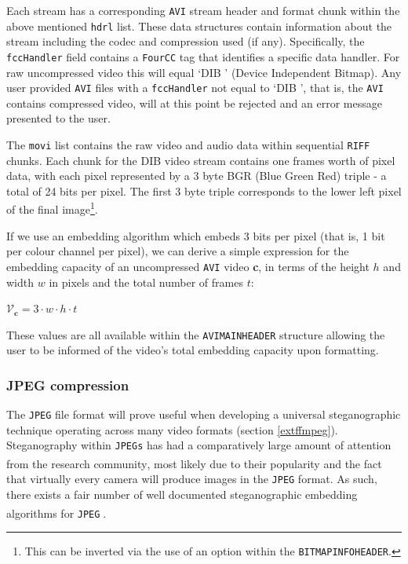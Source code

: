\documentclass[paper=a4, fontsize=11pt,twoside]{scrartcl}
\numberwithin{table}{section}
\numberwithin{figure}{section}
\numberwithin{algorithm}{section}
\begin{document}
\noindent
Each stream has a corresponding \texttt{AVI} stream header and format chunk within the above mentioned \texttt{hdrl} list. These data structures contain information about the stream including the codec and compression used (if any). Specifically, the \texttt{fccHandler} field contains a \texttt{FourCC} tag that identifies a specific data handler. For raw uncompressed video this will equal `DIB ' (Device Independent Bitmap). Any user provided \texttt{AVI} files with a \texttt{fccHandler} not equal to `DIB ', that is, the \texttt{AVI} contains compressed video, will at this point be rejected and an error message presented to the user.

The \texttt{movi} list contains the raw video and audio data within sequential \texttt{RIFF} chunks. Each chunk for the DIB video stream contains one frames worth of pixel data, with each pixel represented by a 3 byte BGR (Blue Green Red) triple - a total of 24 bits per pixel. The first 3 byte triple corresponds to the lower left pixel of the final image\footnote{This can be inverted via the use of an option within the \texttt{BITMAPINFOHEADER}.}. 

If we use an embedding algorithm which embeds 3 bits per pixel (that is, 1 bit per colour channel per pixel), we can derive a simple expression for the embedding capacity of an uncompressed \texttt{AVI} video \textbf{c}, in terms of the height $h$ and width $w$ in pixels and the total number of frames $t$:

\begin{center}
	$\mathcal{V} _{\textbf{c}} = 3 \cdot w \cdot h \cdot t$
\end{center}

\noindent
These values are all available within the \texttt{AVIMAINHEADER} structure allowing the user to be informed of the video's total embedding capacity upon formatting.

\subsubsection{JPEG compression}
\label{jpeg}

The \texttt{JPEG} file format will prove useful when developing a universal steganographic technique operating across many video formats (section \ref{extffmpeg}). Steganography within \texttt{JPEGs} has had a comparatively large amount of attention from the research community\textsuperscript{\cite{jpegsteg}}, most likely due to their popularity and the fact that virtually every camera will produce images in the \texttt{JPEG} format. As such, there exists a fair number of well documented steganographic embedding algorithms for \texttt{JPEG}\textsuperscript{\cite{jsteg} \cite{f5} \cite{outguess}}.
\end{document}
